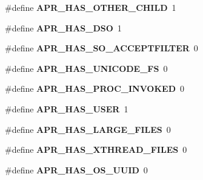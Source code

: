 \begin{DoxyCompactItemize}
\item 
\hypertarget{group__apr__platform_ga082384ec95907197e41f546570e06a69}{\#define {\bfseries A\-P\-R\-\_\-\-H\-A\-S\-\_\-\-O\-T\-H\-E\-R\-\_\-\-C\-H\-I\-L\-D}~1}\label{group__apr__platform_ga082384ec95907197e41f546570e06a69}

\item 
\hypertarget{group__apr__platform_gae41e3d3c78f6937ea2de78b03629494a}{\#define {\bfseries A\-P\-R\-\_\-\-H\-A\-S\-\_\-\-D\-S\-O}~1}\label{group__apr__platform_gae41e3d3c78f6937ea2de78b03629494a}

\item 
\hypertarget{group__apr__platform_gaa6797fde63363c83c54c97a2a873e84d}{\#define {\bfseries A\-P\-R\-\_\-\-H\-A\-S\-\_\-\-S\-O\-\_\-\-A\-C\-C\-E\-P\-T\-F\-I\-L\-T\-E\-R}~0}\label{group__apr__platform_gaa6797fde63363c83c54c97a2a873e84d}

\item 
\hypertarget{group__apr__platform_gae1e6a359fe305ed4ede275f404e61cfe}{\#define {\bfseries A\-P\-R\-\_\-\-H\-A\-S\-\_\-\-U\-N\-I\-C\-O\-D\-E\-\_\-\-F\-S}~0}\label{group__apr__platform_gae1e6a359fe305ed4ede275f404e61cfe}

\item 
\hypertarget{group__apr__platform_gacd61f2c191c71203833599e8caee3e79}{\#define {\bfseries A\-P\-R\-\_\-\-H\-A\-S\-\_\-\-P\-R\-O\-C\-\_\-\-I\-N\-V\-O\-K\-E\-D}~0}\label{group__apr__platform_gacd61f2c191c71203833599e8caee3e79}

\item 
\hypertarget{group__apr__platform_ga9d8d5646ade1d3d29e456d8df29a656a}{\#define {\bfseries A\-P\-R\-\_\-\-H\-A\-S\-\_\-\-U\-S\-E\-R}~1}\label{group__apr__platform_ga9d8d5646ade1d3d29e456d8df29a656a}

\item 
\hypertarget{group__apr__platform_gab5019720a44a0a412b053bd4c8275ac0}{\#define {\bfseries A\-P\-R\-\_\-\-H\-A\-S\-\_\-\-L\-A\-R\-G\-E\-\_\-\-F\-I\-L\-E\-S}~0}\label{group__apr__platform_gab5019720a44a0a412b053bd4c8275ac0}

\item 
\hypertarget{group__apr__platform_ga98aef4781225d1713d088283f4abd8f2}{\#define {\bfseries A\-P\-R\-\_\-\-H\-A\-S\-\_\-\-X\-T\-H\-R\-E\-A\-D\-\_\-\-F\-I\-L\-E\-S}~0}\label{group__apr__platform_ga98aef4781225d1713d088283f4abd8f2}

\item 
\hypertarget{group__apr__platform_gae5e245b691c1f1765e547480de321731}{\#define {\bfseries A\-P\-R\-\_\-\-H\-A\-S\-\_\-\-O\-S\-\_\-\-U\-U\-I\-D}~0}\label{group__apr__platform_gae5e245b691c1f1765e547480de321731}


\end{DoxyCompactItemize}

